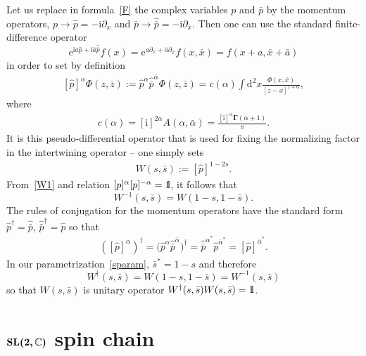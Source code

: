 \documentclass[pdftex]{sigma}
\renewcommand{\imath}{\mathrm{i}}
\newcommand{\II}{\hbox{{1}\kern-.25em\hbox{l}}}
\numberwithin{equation}{section}
\begin{document}
Let us replace in formula~\eqref{F} the complex variables $p$ and $\bar p$
by the momentum operators, $p \to \hat{p} = -\imath\partial_x$ and
$\bar{p} \to \hat{\bar{p}} = -\imath\partial_{\bar{x}}$.
Then one can use the standard finite-difference operator
\begin{equation*}
\mathrm{e}^{\imath a \hat{p}+\imath\bar{a} \hat{\bar{p}}}f(x) =
\mathrm{e}^{a\partial_x+\bar{a}\partial_{\bar{x}}}f(x,\bar{x})=
f(x+a,\bar{x}+\bar{a})
\end{equation*}
in order to set by definition
\begin{align} \label{d}
\left[\hat{p}\right]^{\alpha}\Phi(z,\bar z) :=
\hat{p}^{\alpha}\hat{\bar{p}}^{\bar{\alpha}}\Phi(z,\bar z) =
c(\alpha)
\int \mathrm{d}^2 x
\frac{\Phi(x,\bar x)}{[z-x]^{1+\alpha}},
\end{align}
where
\begin{align}\label{c}
c(\alpha) = [\imath]^{2\alpha} A(\alpha,\bar\alpha) = \frac{[\imath]^{\alpha} \bm{\Gamma}(\alpha+1)}{\pi}.
\end{align}
It is this pseudo-differential operator that is used for fixing the normalizing
factor in the intertwining operator -- one simply sets
\begin{align}
\label{W1}
W(s,\bar{s}) := [\hat{p}]^{1-2s}.
\end{align}
From~\eqref{W1} and relation $[p]^\alpha [p]^{-\alpha} = \II$, it follows that
\begin{equation*}
	W^{-1}(s,\bar{s}) = W(1-s,1-\bar{s}).
\end{equation*}
The rules of conjugation for the momentum
operators have the standard form $\hat{p}^{\dagger} = \hat{\bar{p}}$,
$\hat{\bar{p}}^{\dagger} = \hat{p}$ so that
\begin{align}\label{conj}
([\hat{p}]^{\alpha})^{\dagger} =
\bigl(\hat{p}^{\alpha}\hat{\bar{p}}^{\bar{\alpha}}\bigr)^{\dagger} =
\hat{\bar{p}}^{\alpha^*}\hat{p}^{\bar{\alpha}^*} =
[\hat{p}]^{\bar{\alpha}^*}.
\end{align}
In our parametrization~\eqref{sparam}, $\bar{s}^* = 1-s$ and therefore
\begin{equation*}
	W^{\dagger}(s,\bar{s}) = W(1-s,1-\bar{s}) = W^{-1}(s,\bar{s})
\end{equation*}
so that $W(s,\bar{s})$ is unitary operator
$W^{\dagger}(s,\bar{s}) W(s,\bar{s}) = \II$.

\section[SL(2,C) spin chain]{$\boldsymbol{{\rm SL}(2,\mathbb{C})}$ spin chain}
\label{RQ}
\end{document}
